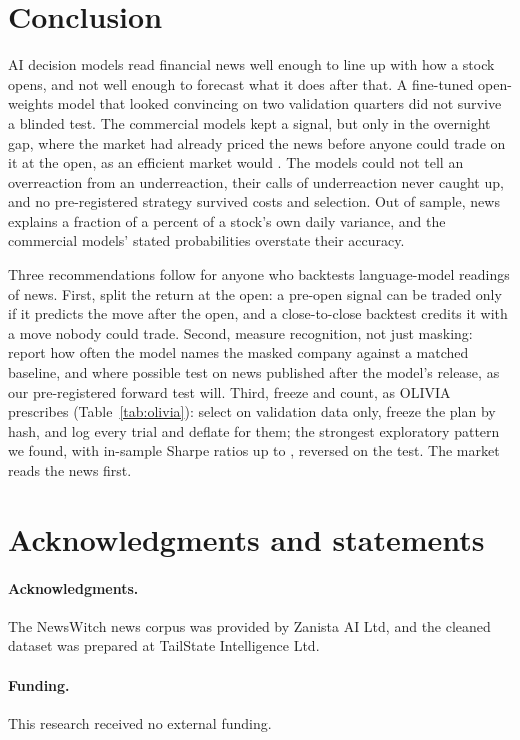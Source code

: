 \section{Conclusion}\label{sec:conclusion}

AI decision models read financial news well enough to line up with how a stock opens, and not well enough to
forecast what it does after that. A fine-tuned open-weights model that looked convincing on two validation
quarters did not survive a blinded test. The commercial models kept a signal, but only in the overnight gap,
where the market had already priced the news before anyone could trade on it at the open, as an efficient market
would \citep{fama1970}. The models could not tell an overreaction from an underreaction, their calls of
underreaction never caught up, and no pre-registered strategy survived costs and selection. Out of sample, news
explains a fraction of a percent of a stock's own daily variance, and the commercial models' stated
probabilities overstate their accuracy.

Three recommendations follow for anyone who backtests language-model readings of news. First, split the return at
the open: a pre-open signal can be traded only if it predicts the move after the open, and a close-to-close
backtest credits it with a move nobody could trade. Second, measure recognition, not just masking: report how
often the model names the masked company against a matched baseline, and where possible test on news published
after the model's release, as our pre-registered forward test will. Third, freeze and count, as OLIVIA prescribes
(Table~\ref{tab:olivia}): select
on validation data only, freeze the plan by hash, and log every trial and deflate for them; the strongest
exploratory pattern we
found, with in-sample Sharpe ratios up to , reversed on the test. The market reads the news
first.

\section*{Acknowledgments and statements}
\paragraph{Acknowledgments.} The NewsWitch news corpus was provided by Zanista AI Ltd, and the cleaned dataset was
prepared at TailState Intelligence Ltd.

\paragraph{Funding.} This research received no external funding.

